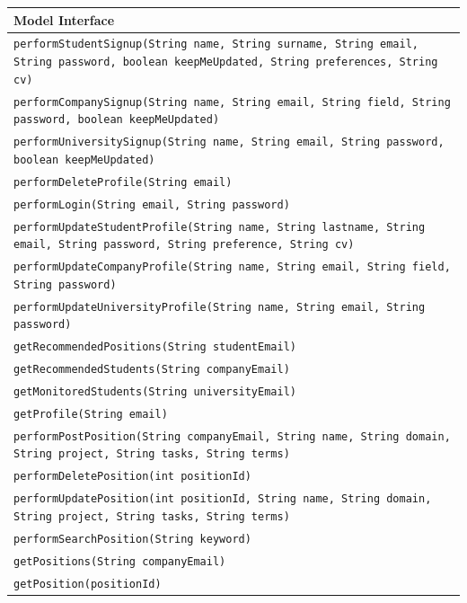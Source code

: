 \renewcommand{\arraystretch}{1.5}
\begin{longtable}{|p{14.5cm}|}
    \hline
    \cellcolor{customgrey}\textbf{Model Interface} \\ \hline
    \texttt{performStudentSignup(String name, String surname, String email, String password, boolean keepMeUpdated, String preferences, String cv)} \\ \hline
    \texttt{performCompanySignup(String name, String email, String field, String password, boolean keepMeUpdated)} \\ \hline
    \texttt{performUniversitySignup(String name, String email, String password, boolean keepMeUpdated)} \\ \hline
    \texttt{performDeleteProfile(String email)} \\ \hline
    \texttt{performLogin(String email, String password)} \\ \hline
    \texttt{performUpdateStudentProfile(String name, String lastname, String email, String password, String preference, String cv)} \\ \hline
    \texttt{performUpdateCompanyProfile(String name, String email, String field, String password)} \\ \hline
    \texttt{performUpdateUniversityProfile(String name, String email, String password)} \\ \hline
    \texttt{getRecommendedPositions(String studentEmail)} \\ \hline
    \texttt{getRecommendedStudents(String companyEmail)} \\ \hline
    \texttt{getMonitoredStudents(String universityEmail)} \\ \hline
    \texttt{getProfile(String email)} \\ \hline

    \texttt{performPostPosition(String companyEmail, String name, String domain, String project, String tasks, String terms)} \\ \hline
    \texttt{performDeletePosition(int positionId)} \\ \hline
    \texttt{performUpdatePosition(int positionId, String name, String domain, String project, String tasks, String terms)} \\ \hline
    \texttt{performSearchPosition(String keyword)} \\ \hline
    \texttt{getPositions(String companyEmail)} \\ \hline
    \texttt{getPosition(positionId)} \\ \hline


\end{longtable}
